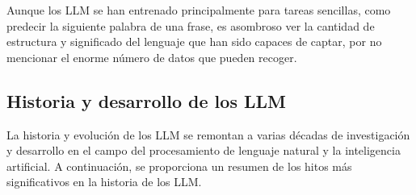 Aunque los LLM se han entrenado principalmente para tareas sencillas, como predecir la siguiente palabra de una frase, es asombroso ver la cantidad de estructura y significado del lenguaje que han sido capaces de captar, por no mencionar el enorme número de datos que pueden recoger.

\subsection{Historia y desarrollo de los LLM}

La historia y evolución de los LLM se remontan a varias décadas de investigación y desarrollo en el campo del procesamiento de lenguaje natural y la inteligencia artificial. A continuación, se proporciona un resumen de los hitos más significativos en la historia de los LLM\cite{zhao2023survey,scribbleData,Tolaka}.


